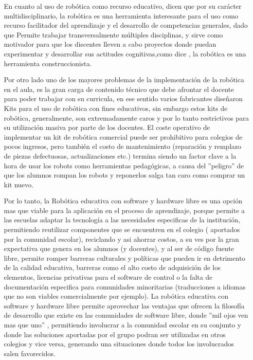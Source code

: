 En cuanto al uso de robótica como recurso educativo, \citet{sanchez_robotica_2012} dicen que por su carácter multidisciplinario, la robótica es una herramienta interesante para el uso como recurso facilitador del aprendizaje y el desarrollo de competencias generales, dado que Permite trabajar transversalmente múltiples disciplinas, y sirve como motivador para que los discentes lleven a cabo proyectos donde puedan experimentar y desarrollar sus actitudes cognitivas,como dice \citet{pitti_experiencias_2010}, la robótica es una herramienta construccionista. 
 
Por otro lado uno de los mayores problemas de la implementación de la robótica en el aula, es la gran carga de contenido técnico que debe afrontar el docente para poder trabajar con su curricula, en ese sentido varios fabricantes diseñaron Kits para el uso de robótica con fines educativos, sin embargo estos kits de robótica, generalmente,  son extremadamente caros y por lo tanto restrictivos para su utilización masiva por parte de los docentes. El coste operativo de implementar un kit de robótica comercial puede ser prohibitivo para colegios de pocos ingresos, pero también el costo de mantenimiento (reparación y remplazo de piezas defectuosas, actualizaciones etc.) termina siendo un factor clave a la hora de usar los robots como herramientas pedagógicas, a causa del ''peligro'' de que los alumnos rompan los robots y reponerlos salga tan caro como comprar un kit nuevo.

Por lo tanto, la Robótica educativa con software y hardware libre es una opción mas que viable para la aplicación en el proceso de aprendizaje, 
porque permite a las escuelas adaptar la tecnología a las necesidades especificas de la institución, permitiendo reutilizar componentes que se encuentren en el colegio ( aportados por la comunidad escolar), reciclando y asi ahorrar costos, a su ves por la gran expectativa que genera en los alumnos (y docentes), y al ser de código fuente libre, permite romper barreras culturales y políticas que pueden ir en detrimento de la calidad educativa, barreras como el alto costo de adquisición de los elementos, licencias privativas para el software de control o la falta de documentación especifica para comunidades minoritarias (traducciones a idiomas que no son viables comercialmente por ejemplo). La robótica educativa con software y hardware libre permite aprovechar las ventajas que ofrecen la filosofía de desarrollo que existe en las comunidades de software libre, donde ''mil ojos ven mas que uno'' \citet{raymond_catedral_1998}, permitiendo involucrar a la comunidad escolar en su conjunto y donde las soluciones aportadas por el grupo podran ser utilizadas en otros colegios y vice versa, generando una situaciones donde todos los involucrados salen favorecidos.


